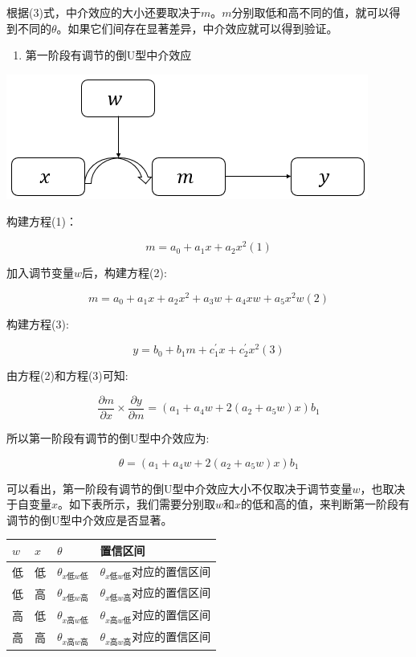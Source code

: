 \documentclass[
]{book}
\providecommand{\tightlist}{%
  \setlength{\itemsep}{0pt}\setlength{\parskip}{0pt}}
\begin{document}
根据(3)式，中介效应的大小还要取决于\(m\)。\(m\)分别取低和高不同的值，就可以得到不同的\(\theta\)。如果它们间存在显著差异，中介效应就可以得到验证。

\begin{enumerate}
\def\labelenumi{\arabic{enumi}.}
\setcounter{enumi}{3}
\tightlist
\item
  第一阶段有调节的倒U型中介效应
\end{enumerate}

\includegraphics{figs/1224.png}

构建方程(1)：

\[
m=a_{0}+a_{1}x+a_{2}x^{2}(1)
\]

加入调节变量\(w\)后，构建方程(2):

\[
m=a_{0}+a_{1}x+a_{2}x^{2}+a_{3}w+a_{4}xw+a_{5}x^{2}w(2)
\]

构建方程(3):

\[
y=b_{0}+b_{1}m+c^{'}_{1}x+c^{'}_{2}x^{2}(3)
\]

由方程(2)和方程(3)可知:

\[
\frac{\partial m}{\partial x}{\times}\frac{\partial y}{\partial m}=(a_{1}+a_{4}w+2(a_{2}+a_{5}w)x)b_{1}
\]

所以第一阶段有调节的倒U型中介效应为:

\[
\theta=(a_{1}+a_{4}w+2(a_{2}+a_{5}w)x)b_{1}
\]

可以看出，第一阶段有调节的倒U型中介效应大小不仅取决于调节变量\(w\)，也取决于自变量\(x\)。如下表所示，我们需要分别取\(w\)和\(x\)的低和高的值，来判断第一阶段有调节的倒U型中介效应是否显著。

\begin{longtable}[]{@{}llll@{}}
\toprule
\(w\) & \(x\) & \(\theta\) & 置信区间\tabularnewline
\midrule
\endhead
低 & 低 & \(\theta_{x低w低}\) & \(\theta_{x低w低}\)对应的置信区间\tabularnewline
低 & 高 & \(\theta_{x低w高}\) & \(\theta_{x低w高}\)对应的置信区间\tabularnewline
高 & 低 & \(\theta_{x高w低}\) & \(\theta_{x高w低}\)对应的置信区间\tabularnewline
高 & 高 & \(\theta_{x高w高}\) & \(\theta_{x高w高}\)对应的置信区间\tabularnewline
\bottomrule
\end{longtable}
\end{document}
